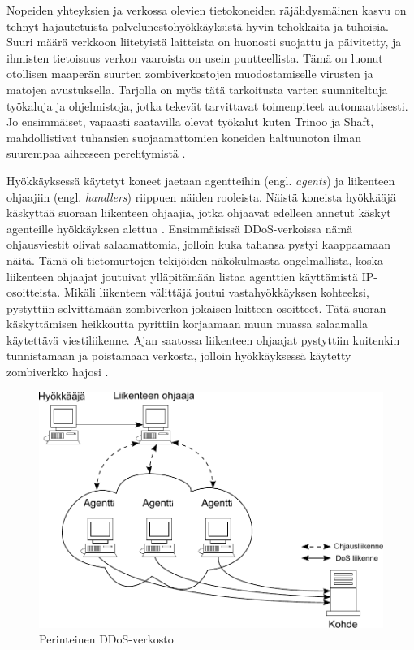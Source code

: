 Nopeiden yhteyksien ja verkossa olevien tietokoneiden räjähdysmäinen
kasvu on tehnyt hajautetuista palvelunestohyökkäyksistä hyvin
tehokkaita ja tuhoisia. Suuri määrä verkkoon liitetyistä laitteista on
huonosti suojattu ja päivitetty, ja ihmisten tietoisuus verkon
vaaroista on usein puutteellista. Tämä on luonut otollisen maaperän
suurten zombiverkostojen muodostamiselle virusten ja matojen
avustuksella. Tarjolla on myös tätä tarkoitusta varten suunniteltuja
työkaluja ja ohjelmistoja, jotka tekevät tarvittavat toimenpiteet
automaattisesti. Jo ensimmäiset, vapaasti saatavilla olevat työkalut
kuten Trinoo ja Shaft, mahdollistivat tuhansien suojaamattomien
koneiden haltuunoton ilman suurempaa aiheeseen perehtymistä \cite{DDOS}.

Hyökkäyksessä käytetyt koneet jaetaan agentteihin (engl. \textit{agents})
ja liikenteen ohjaajiin (engl. \textit{handlers}) riippuen näiden
rooleista. Näistä koneista hyökkääjä käskyttää suoraan liikenteen
ohjaajia, jotka ohjaavat edelleen annetut käskyt agenteille
hyökkäyksen alettua \cite{WEBS}\cite{DDOS}. Ensimmäisissä 
DDoS-verkoissa nämä ohjausviestit olivat salaamattomia, jolloin kuka tahansa
pystyi kaappaamaan näitä. Tämä oli tietomurtojen tekijöiden
näkökulmasta ongelmallista, koska liikenteen ohjaajat joutuivat
ylläpitämään listaa agenttien käyttämistä IP-osoitteista. Mikäli liikenteen välittäjä
joutui vastahyökkäyksen kohteeksi, pystyttiin selvittämään zombiverkon jokaisen
laitteen osoitteet. Tätä suoran käskyttämisen heikkoutta pyrittiin korjaamaan muun
muassa salaamalla käytettävä viestiliikenne. Ajan saatossa liikenteen
ohjaajat pystyttiin kuitenkin tunnistamaan ja poistamaan verkosta,
jolloin hyökkäyksessä käytetty zombiverkko hajosi \cite{DDOS}.

\begin{figure}[htp]
\centering
\includegraphics[width=12cm]{pics/perinteinen_ddos.pdf}
\caption{Perinteinen DDoS-verkosto}
\label{ddos1}
\end{figure}

